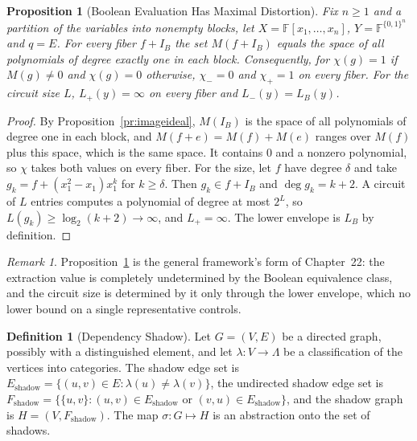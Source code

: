 \documentclass[11pt,letterpaper]{report}
\theoremstyle{plain}
\newtheorem{proposition}[theorem]{Proposition}
\theoremstyle{definition}
\newtheorem{definition}[theorem]{Definition}
\theoremstyle{remark}
\newtheorem{remark}[theorem]{Remark}
\begin{document}
\begin{proposition}[Boolean Evaluation Has Maximal Distortion]\label{pr:boolmaxdist}
Fix $n\ge1$ and a partition of the variables into nonempty blocks, let $X=\mathbb F[x_1,\dots,x_n]$, $Y=\mathbb F^{\{0,1\}^n}$ and $q=E$. For every fiber $f+I_B$ the set $M(f+I_B)$ equals the space of all polynomials of degree exactly one in each block. Consequently, for $\chi(g)=1$ if $M(g)\ne0$ and $\chi(g)=0$ otherwise, $\chi_-=0$ and $\chi_+=1$ on every fiber. For the circuit size $L$, $L_+(y)=\infty$ on every fiber and $L_-(y)=L_B(y)$.
\end{proposition}
\begin{proof}
By Proposition~\ref{pr:imageideal}, $M(I_B)$ is the space of all polynomials of degree one in each block, and $M(f+e)=M(f)+M(e)$ ranges over $M(f)$ plus this space, which is the same space. It contains $0$ and a nonzero polynomial, so $\chi$ takes both values on every fiber. For the size, let $f$ have degree $\delta$ and take $g_k=f+(x_1^2-x_1)x_1^k$ for $k\ge\delta$. Then $g_k\in f+I_B$ and $\deg g_k=k+2$. A circuit of $L$ entries computes a polynomial of degree at most $2^L$, so $L(g_k)\ge\log_2(k+2)\to\infty$, and $L_+=\infty$. The lower envelope is $L_B$ by definition.
\end{proof}

\begin{remark}
Proposition~\ref{pr:boolmaxdist} is the general framework's form of Chapter~22: the extraction value is completely undetermined by the Boolean equivalence class, and the circuit size is determined by it only through the lower envelope, which no lower bound on a single representative controls.
\end{remark}

\begin{definition}[Dependency Shadow]\label{def:shadow}
Let $G=(V,E)$ be a directed graph, possibly with a distinguished element, and let $\lambda:V\to\Lambda$ be a classification of the vertices into categories. The shadow edge set is $E_{\mathrm{shadow}}=\{(u,v)\in E:\lambda(u)\ne\lambda(v)\}$, the undirected shadow edge set is $F_{\mathrm{shadow}}=\{\{u,v\}:(u,v)\in E_{\mathrm{shadow}}\text{ or }(v,u)\in E_{\mathrm{shadow}}\}$, and the shadow graph is $H=(V,F_{\mathrm{shadow}})$. The map $\sigma:G\mapsto H$ is an abstraction onto the set of shadows.
\end{definition}
\end{document}

